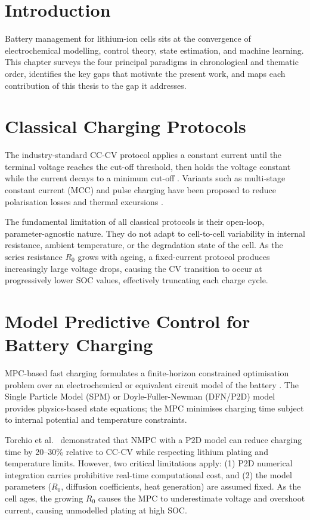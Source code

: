 \label{chap.2}

\section{Introduction}

Battery management for lithium-ion cells sits at the convergence of
electrochemical modelling, control theory, state estimation, and
machine learning.  This chapter surveys the four principal paradigms
in chronological and thematic order, identifies the key gaps that
motivate the present work, and maps each contribution of this thesis
to the gap it addresses.

\section{Classical Charging Protocols}

The industry-standard CC-CV protocol applies a constant current
until the terminal voltage reaches the cut-off threshold, then holds
the voltage constant while the current decays to a minimum cut-off
\cite{bloom2001accelerated}.  Variants such as multi-stage constant
current (MCC) and pulse charging have been proposed to reduce
polarisation losses and thermal excursions
\cite{purushothaman2006multistage}.

The fundamental limitation of all classical protocols is their
open-loop, parameter-agnostic nature.  They do not adapt to
cell-to-cell variability in internal resistance, ambient temperature,
or the degradation state of the cell.  As the series resistance
$R_0$ grows with ageing, a fixed-current protocol produces
increasingly large voltage drops, causing the CV transition to occur
at progressively lower SOC values, effectively truncating each charge
cycle.

\section{Model Predictive Control for Battery Charging}

MPC-based fast charging formulates a finite-horizon constrained
optimisation problem over an electrochemical or equivalent circuit
model of the battery \cite{torchio2016lionsimba}.  The Single
Particle Model (SPM) or Doyle-Fuller-Newman (DFN/P2D) model provides
physics-based state equations; the MPC minimises charging time
subject to internal potential and temperature constraints.

Torchio et al.~\cite{torchio2016lionsimba} demonstrated that
NMPC with a P2D model can reduce charging time by 20--30\% relative
to CC-CV while respecting lithium plating and temperature limits.
However, two critical limitations apply: (1) P2D numerical
integration carries prohibitive real-time computational cost, and
(2) the model parameters ($R_0$, diffusion coefficients, heat
generation) are assumed fixed.  As the cell ages, the growing
$R_0$ causes the MPC to underestimate voltage and overshoot
current, causing unmodelled plating at high SOC.

